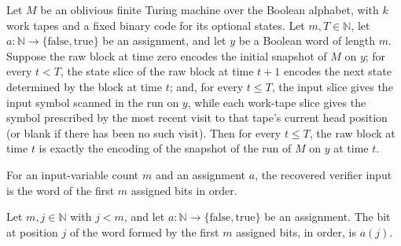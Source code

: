 \begin{lemma}
\label{Complexity.clA5Reconstruct}
\leanok
{}
Let $M$ be an oblivious finite Turing machine over the Boolean alphabet, with $k$ work
tapes and a fixed binary code for its optional states. Let $m,T \in \mathbb{N}$, let $a
: \mathbb{N} \to \{\mathrm{false},\mathrm{true}\}$ be an assignment, and let $y$ be a
Boolean word of length $m$. Suppose the raw block at time zero encodes the initial
snapshot of $M$ on $y$; for every $t<T$, the state slice of the raw block at time $t+1$
encodes the next state determined by the block at time $t$; and, for every $t\le T$, the
input slice gives the input symbol scanned in the run on $y$, while each work-tape slice
gives the symbol prescribed by the most recent visit to that tape's current head
position (or blank if there has been no such visit). Then for every $t\le T$, the raw
block at time $t$ is exactly the encoding of the snapshot of the run of $M$ on $y$ at
time $t$.
\end{lemma}

\begin{definition}
\label{Complexity.clA5ReadInput}
\leanok
For an input-variable count $m$ and an assignment $a$, the recovered verifier input is the word of the first $m$ assigned bits in order.
\end{definition}

\begin{lemma}
\label{Complexity.clA5ReadInput_get}
\leanok
{}
Let $m,j \in \mathbb{N}$ with $j<m$, and let $a : \mathbb{N} \to
\{\mathrm{false},\mathrm{true}\}$ be an assignment. The bit at position $j$ of the word
formed by the first $m$ assigned bits, in order, is $a(j)$.
\end{lemma}

